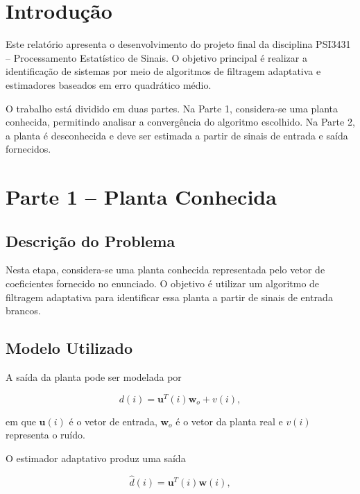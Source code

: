 \documentclass[12pt,a4paper]{article}
\begin{document}
\section{Introdução}

Este relatório apresenta o desenvolvimento do projeto final da disciplina PSI3431 -- Processamento Estatístico de Sinais. O objetivo principal é realizar a identificação de sistemas por meio de algoritmos de filtragem adaptativa e estimadores baseados em erro quadrático médio.

O trabalho está dividido em duas partes. Na Parte 1, considera-se uma planta conhecida, permitindo analisar a convergência do algoritmo escolhido. Na Parte 2, a planta é desconhecida e deve ser estimada a partir de sinais de entrada e saída fornecidos.

\section{Parte 1 -- Planta Conhecida}

\subsection{Descrição do Problema}

Nesta etapa, considera-se uma planta conhecida representada pelo vetor de coeficientes fornecido no enunciado. O objetivo é utilizar um algoritmo de filtragem adaptativa para identificar essa planta a partir de sinais de entrada brancos.

\subsection{Modelo Utilizado}

A saída da planta pode ser modelada por

\begin{equation}
    d(i) = \mathbf{u}^T(i)\mathbf{w}_o + v(i),
\end{equation}

em que $\mathbf{u}(i)$ é o vetor de entrada, $\mathbf{w}_o$ é o vetor da planta real e $v(i)$ representa o ruído.

O estimador adaptativo produz uma saída

\begin{equation}
    \hat{d}(i) = \mathbf{u}^T(i)\mathbf{w}(i),
\end{equation}
\end{document}
